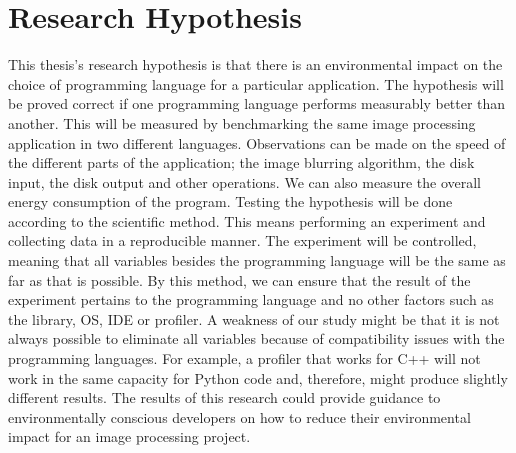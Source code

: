 \chapter{Research Hypothesis}
This thesis’s research hypothesis is that there is an environmental impact on the choice of programming language for a particular application.
The hypothesis will be proved correct if one programming language performs measurably better than another. This will be measured by benchmarking the same image processing application in two different languages. Observations can be made on the speed of the different parts of the application; the image blurring algorithm, the disk input, the disk output and other operations. We can also measure the overall energy consumption of the program.
Testing the hypothesis will be done according to the scientific method. This means performing an experiment and collecting data in a reproducible manner. The experiment will be controlled, meaning that all variables besides the programming language will be the same as far as that is possible. By this method, we can ensure that the result of the experiment pertains to the programming language and no other factors such as the library, OS, IDE or profiler.
A weakness of our study might be that it is not always possible to eliminate all variables because of compatibility issues with the programming languages. For example, a profiler that works for C++ will not work in the same capacity for Python code and, therefore, might produce slightly different results.
The results of this research could provide guidance to environmentally conscious developers on how to reduce their environmental impact for an image processing project.
